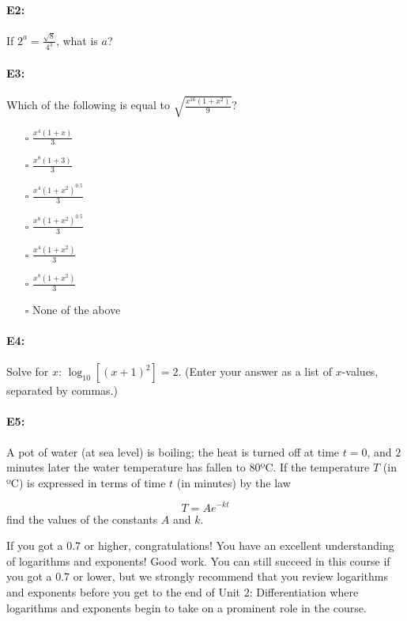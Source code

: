 \documentclass[pdftex, brazil, 12pt, twoside]{article}
\begin{document}
\paragraph{E2:} If $2^a = \frac{\sqrt{8}}{4^3}$, what is $a$?

\paragraph{E3:} Which of the following is equal to $\sqrt{\frac{x^{16}(1 + x^2)}{9}}$?

\begin{itemize}
\item[$\square$] $\frac{x^4(1+x)}{3}$
\item[$\square$] $\frac{x^8(1+3)}{3}$
\item[$\square$] $\frac{x^4(1+x^2)^{0.5}}{3}$
\item[$\square$] $\frac{x^8(1+x^2)^{0.5}}{3}$
\item[$\square$] $\frac{x^4(1+x^2)}{3}$
\item[$\square$] $\frac{x^8(1+x^2)}{3}$
\item[$\square$] None of the above
\end{itemize}

\paragraph{E4:} Solve for $x$: $\log_{10}\left[(x+1)^2\right] = 2$. (Enter your answer as a list of $x$-values, separated by commas.)

\paragraph{E5:} A pot of water (at sea level) is boiling; the heat is turned off at time $t=0$, and $2$ minutes later the water temperature has fallen to $80$ºC. If the temperature $T$ (in ºC) is expressed in terms of time $t$ (in minutes) by the law

\begin{equation}
  T = Ae^{-kt}
\end{equation}
\noindent
find the values of the constants $A$ and $k$.

If you got a 0.7 or higher, congratulations! You have an excellent understanding of logarithms and exponents! Good work.
You can still succeed in this course if you got a 0.7 or lower, but we strongly recommend that you review logarithms and exponents before you get to the end of Unit 2: Differentiation where logarithms and exponents begin to take on a prominent role in the course.
\end{document}
